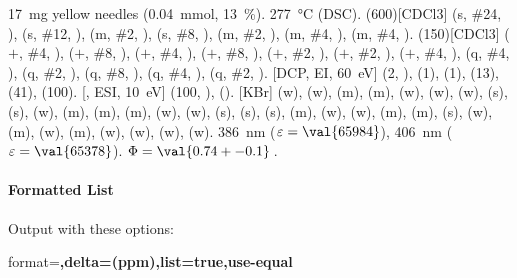 \documentclass{chemmacros-manual}
\begin{document}
\begin{experimental}[delta=(ppm),pos-number=sub,use-equal]
   \SI{17}{\milli\gram} yellow needles (\SI{0.04}{\milli\mole},
  \SI{13}{\percent}).
   \SI{277}{\celsius} (DSC).
  \NMR(600)[CDCl3]  (s, \#{24}, ),  (s, \#{12},
  ),  (m, \#{2}, ),  (s, \#{8},
  ),  (m, \#{2}, ),  (m, \#{4},
  ),  (m, \#{4}, ).
  (150)[CDCl3]  ($+$, \#{4}, ),  ($+$,
  \#{8}, ),  ($+$, \#{4}, ),  ($+$, \#{8},
  ),  ($+$, \#{2}, ),  ($+$, \#{2},
  ),  ($+$, \#{4}, ),  (q, \#{4},
  ),  (q, \#{2}, ),  (q, \#{8}, ),
   (q, \#{4}, ),  (q, \#{2}, ).
  [DCP, EI, \SI{60}{\electronvolt}]  (2, ), 
  (1),  (1),  (13),  (41),  (100).
  [, ESI, \SI{10}{\electronvolt}]  (100,
  ),  ().
  [KBr]  (w),  (w),  (m), 
  (m),  (w),  (w),  (w),  (s),
   (s),  (w),  (m),  (m), 
  (m),  (w),  (w),  (s),  (s),
   (s),  (m),  (w),  (w), 
  (m),  (m),  (s),  (w),  (m), 
  (w),  (m),  (w),  (w),  (w), 
  (w).
   \SI{386}{\nano\metre} ($\varepsilon = \val{65984}$),
  \SI{406}{\nano\metre} ($\varepsilon = \val{65378}$).
   $\Phi = \val{0.74+-0.1}$\,.
\end{experimental}

\paragraph{Formatted List}
Output with these options:

\begin{sourcecode}
  format=\bfseries,delta=(ppm),list=true,use-equal
\end{sourcecode}
\end{document}

